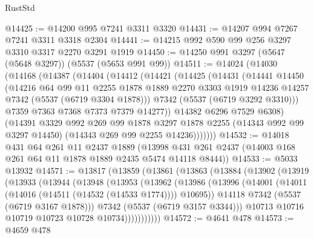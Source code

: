 \begin{lexlean}{RustStd}
\begin{coremodule}
@14425 := @14200 @995 @7241 @3311 @3320
@14431 := @14207 @994 @7267 @7241 @3311 @3318 @2304
@14441 := @14215 @992 @590 @99 @256 @3297 @3310 @3317 @2270 @3291 @1919
@14450 := @14250 @991 @3297 (@5647 (@5648 @3297)) (@5537 (@5653 @991 @99))
@14511 := @14024
    (@14030
      (@14168
        (@14387
          (@14404
            (@14412
              (@14421
                (@14425
                  (@14431
                    (@14441
                      @14450
                      (@14216
                        @64
                        @99
                        @11
                        @2255
                        @1878
                        @1889
                        @2270
                        @3303
                        @1919
                        @14236
                        @14257
                        @7342
                        (@5537 (@6719 @3304 @1878)))
                      @7342
                      (@5537 (@6719 @3292 @3310)))
                    @7359
                    @7363
                    @7368
                    @7373
                    @7379
                    @14277))
                @14382
                @6296
                @7529
                @6308)
              (@14391
                @3329
                @992
                @269
                @99
                @1878
                @3297
                @1878
                @2255
                (@14343 @992 @99 @3297 @14450)
                (@14343 @269 @99 @2255 @14236)))))))
@14532 := @14018
    @431
    @64
    @261
    @11
    @2437
    @1889
    (@13998 @431 @261 @2437 (@14003 @168 @261 @64 @11 @1878 @1889 @2435 @5474 @14118 @8444))
@14533 := @5033 @13932
@14571 := @13817
    (@13859
      (@13861
        (@13863
          (@13884
            (@13902
              (@13919
                (@13933
                  (@13944
                    (@13948
                      (@13953
                        (@13962
                          (@13986
                            (@13996
                              (@14001 (@14011 (@14016 (@14511 (@14532 (@14533 @1774)))) @10695))
                              @14118
                              @7342
                              (@5537 (@6719 @3167 @1878)))
                            @7342
                            (@5537 (@6719 @3157 @3344)))
                          @10713
                          @10716
                          @10719
                          @10723
                          @10728
                          @10734)))))))))))
@14572 := @4641 @478
@14573 := @4659 @478

\end{coremodule}
\end{lexlean}
